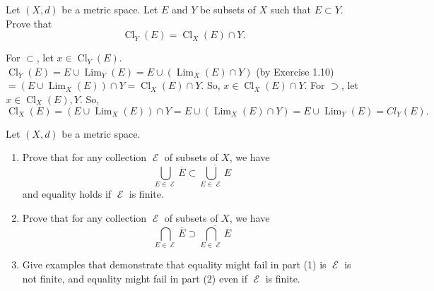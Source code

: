\documentclass[12pt,letterpaper,boxed]{hmcpset}
\DeclareMathOperator{\Lim}{Lim}
\DeclareMathOperator{\Cl}{Cl}
\DeclareMathOperator{\bigep}{\mathcal{E}}
\begin{document}

\begin{problem}[Exercise 1.25]
Let $(X, d)$ be a metric space. Let $E$ and $Y$ be subsets of $X$ such that $E\subset Y.$ Prove that $$\Cl_Y(E)=\Cl_X(E)\cap Y.$$
\end{problem}

\begin{solution}
For $\subset$, let $x\in \Cl_Y(E)$. $\Cl_Y(E)= E \cup \Lim_Y(E)= E \cup (\Lim_X(E)\cap Y)$ (by Exercise 1.10) $ = (E \cup \Lim_X(E))\cap Y = \Cl_X(E)\cap Y.$ So, $x \in \Cl_X(E)\cap Y.$ For $\supset$, let $x\in\Cl_X(E), Y$. So, $\Cl_X(E) = (E \cup \Lim_X(E))\cap Y = E \cup (\Lim_X(E)\cap Y) = E \cup \Lim_Y(E) = Cl_Y(E).$
\end{solution}

\begin{problem}[Exercise 1.26]
Let $(X, d)$ be a metric space.
	\vspace{-2mm}
	\begin{enumerate}
		\itemsep0em
		\item Prove that for any collection $\bigep$ of subsets of $X$, we have $$ \bigcup_{E\in\bigep} \overline{E} \subset \overline{\bigcup_{E\in\bigep} E}$$ and equality holds if $\bigep$ is finite.
		\item Prove that for any collection $\bigep$ of subsets of $X$, we have $$ \bigcap_{E\in\bigep} \overline{E} \supset \overline{\bigcap_{E\in\bigep} E}$$
		\item Give examples that demonstrate that equality might fail in part (1) is $\bigep$ is not finite, and equality might fail in part (2) even if $\bigep$ is finite.
	\end{enumerate}
\end{problem}
\end{document}
